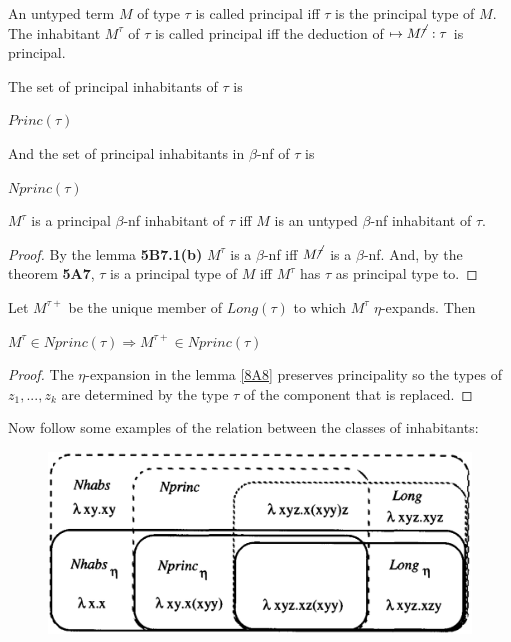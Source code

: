 \documentclass[a4paper,10pt]{article}
\begin{document}
\begin{mydef}

An untyped term $M$ of type $\tau$ is called principal iff $\tau$ is
the principal type of $M$. The inhabitant $M^{\tau}$ of $\tau$ is
called principal iff the deduction of $\mapsto M^{\cancel{\tau}} :
\tau$ is principal.

The set of principal inhabitants of $\tau$ is

   \begin{center}
         $Princ(\tau)$
   \end{center}

And the set of principal inhabitants in $\beta$-nf of $\tau$ is

   \begin{center}
      $Nprinc(\tau)$
    \end{center}
\end{mydef}

\begin{lem}

  $M^{\tau}$ is a principal $\beta$-nf inhabitant of $\tau$ iff $M$ is an untyped
  $\beta$-nf inhabitant of $\tau$.

\end{lem}

\begin{proof}
By the lemma \textbf{5B7.1(b)} $M^{\tau}$ is a $\beta$-nf iff $M^{\cancel{\tau}}$ is a $\beta$-nf. And, by the 
theorem \textbf{5A7}, $\tau$ is a principal type of $M$ iff $M^{\tau}$ has $\tau$ as principal type to.
\end{proof}

\begin{lem}
    Let $M^{\tau+}$ be the unique member of $Long(\tau)$ to which
    $M^{\tau}$ $\eta$-expands. Then

  \begin{center}
       $M^{\tau} \in Nprinc(\tau) \Longrightarrow M^{\tau+} \in Nprinc(\tau)$
   \end{center}
\end{lem}

\begin{proof}
 The $\eta$-expansion in the lemma \ref{8A8} preserves principality so the types of $z_1, ..., z_k$ are determined by the type $\tau$ of the component that is replaced.
\end{proof}

Now follow some examples of the relation between the classes of inhabitants:

\begin{figure}[h]
   \centering
   \includegraphics[scale=0.4]{fig2.png}
\end{figure}
\end{document}

